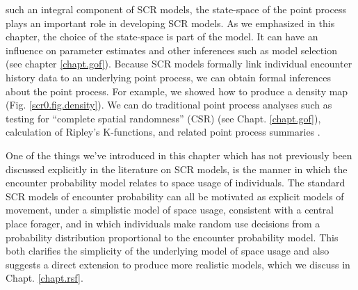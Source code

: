 {such an integral component of SCR models, the state-space of the point
process plays an important role in developing SCR models. As we
emphasized in this chapter, the choice of the state-space is part of
the model. It can have an influence on parameter estimates and other
inferences such as model selection (see chapter \ref{chapt.gof}).
Because SCR models formally link individual encounter history data to
an underlying point process, we can obtain formal inferences about the
point process. For example, we showed how to produce a density
map (Fig. \ref{scr0.fig.density}). We can do
traditional point process analyses such as testing for
``complete spatial randomness''
(CSR) (see Chapt.  \ref{chapt.gof}),
calculation of Ripley's K-functions,
and related point process summaries \citep{illian_etal:2008}.

One of the things we've introduced in this chapter which has not
previously been discussed explicitly in the literature on SCR models,
is the manner in which the encounter probability model relates to
space usage of individuals. The standard SCR models of encounter
probability can all be motivated as explicit models of movement, under
a simplistic model of space usage, consistent with a central place
forager, and  in which individuals make random use
decisions from a probability distribution proportional to the
encounter probability model. This both clarifies the simplicity of the
underlying model of space usage and also suggests a direct extension
to produce more realistic models, which we discuss in Chapt. \ref{chapt.rsf}.



}
